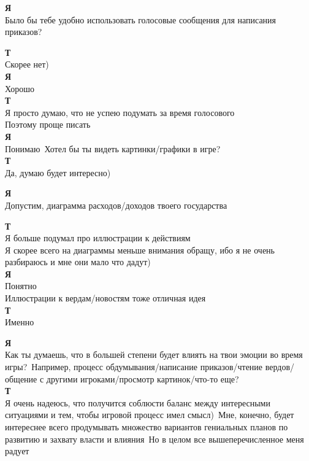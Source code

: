 \textbf{Я}\\
Было бы тебе удобно использовать голосовые сообщения для написания приказов?

\textbf{Т}\\
Скорее нет)\\

\textbf{Я}\\
Хорошо\\

\textbf{Т}\\
Я просто думаю, что не успею подумать за время голосового\\
Поэтому проще писать\\

\textbf{Я}\\
Понимаю\
Хотел бы ты видеть картинки/графики в игре?\\

\textbf{Т}\\
Да, думаю будет интересно)

\textbf{Я}\\
Допустим, диаграмма расходов/доходов твоего государства

\textbf{Т}\\
Я больше подумал про иллюстрации к действиям\\
Я скорее всего на диаграммы меньше внимания обращу, ибо я не очень разбираюсь и мне они мало что дадут)\\

\textbf{Я}\\
Понятно\\
Иллюстрации к вердам/новостям тоже отличная идея\\

\textbf{Т}\\
Именно

\textbf{Я}\\
Как ты думаешь, что в большей степени будет влиять на твои эмоции во время игры?\
Например, процесс обдумывания/написание приказов/чтение вердов/общение с другими игроками/просмотр картинок/что-то еще?\\

\textbf{Т}\\
Я очень надеюсь, что получится соблюсти баланс между интересными ситуациями и тем, чтобы игровой процесс имел смысл)\
Мне, конечно, будет интереснее всего продумывать множество вариантов гениальных планов по развитию и захвату власти и влияния\
Но в целом все вышеперечисленное меня радует\\

